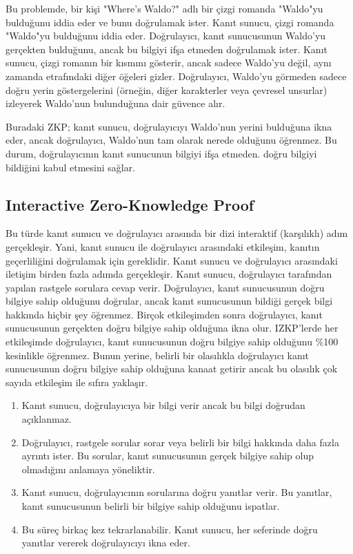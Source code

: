 Bu problemde, bir kişi "Where's Waldo?" adlı bir çizgi romanda "Waldo"yu bulduğunu iddia eder ve bunu doğrulamak ister. Kanıt sunucu, çizgi romanda "Waldo"yu bulduğunu iddia eder. Doğrulayıcı, kanıt sunucusunun Waldo'yu gerçekten bulduğunu, ancak bu bilgiyi ifşa etmeden doğrulamak ister. Kanıt sunucu, çizgi romanın bir kısmını gösterir, ancak sadece Waldo'yu değil, aynı zamanda etrafındaki diğer öğeleri gizler. Doğrulayıcı, Waldo'yu görmeden sadece doğru yerin göstergelerini (örneğin, diğer karakterler veya çevresel unsurlar) izleyerek Waldo'nun bulunduğuna dair güvence alır.

Buradaki ZKP; kanıt sunucu, doğrulayıcıyı Waldo'nun yerini bulduğuna ikna eder, ancak doğrulayıcı, Waldo'nun tam olarak nerede olduğunu öğrenmez. Bu durum, doğrulayıcının kanıt sunucunun bilgiyi ifşa etmeden. doğru bilgiyi bildiğini kabul etmesini sağlar.

\newpage

\subsection{Interactive Zero-Knowledge Proof}

Bu türde kanıt sunucu ve doğrulayıcı arasında bir dizi interaktif (karşılıklı) adım gerçekleşir. Yani, kanıt sunucu ile doğrulayıcı arasındaki etkileşim, kanıtın geçerliliğini doğrulamak için gereklidir. Kanıt sunucu ve doğrulayıcı arasındaki iletişim birden fazla adımda gerçekleşir. Kanıt sunucu, doğrulayıcı tarafından yapılan rastgele sorulara cevap verir. Doğrulayıcı, kanıt sunucusunun doğru bilgiye sahip olduğunu doğrular, ancak kanıt sunucusunun bildiği gerçek bilgi hakkında hiçbir şey öğrenmez. Birçok etkileşimden sonra doğrulayıcı, kanıt sunucusunun gerçekten doğru bilgiye sahip olduğuna ikna olur. IZKP’lerde her etkileşimde doğrulayıcı, kanıt sunucusunun doğru bilgiye sahip olduğunu \%100 kesinlikle öğrenmez. Bunun yerine, belirli bir olasılıkla doğrulayıcı kanıt sunucusunun doğru bilgiye sahip olduğuna kanaat getirir ancak bu olasılık çok sayıda etkileşim ile sıfıra yaklaşır.

\begin{enumerate}
    \item Kanıt sunucu, doğrulayıcıya bir bilgi verir ancak bu bilgi doğrudan açıklanmaz.
    \item Doğrulayıcı, rastgele sorular sorar veya belirli bir bilgi hakkında daha fazla ayrıntı ister. Bu sorular, kanıt sunucusunun gerçek bilgiye sahip olup olmadığını anlamaya yöneliktir.
    \item Kanıt sunucu, doğrulayıcının sorularına doğru yanıtlar verir. Bu yanıtlar, kanıt sunucusunun belirli bir bilgiye sahip olduğunu ispatlar.
    \item Bu süreç birkaç kez tekrarlanabilir. Kanıt sunucu, her seferinde doğru yanıtlar vererek doğrulayıcıyı ikna eder.
\end{enumerate}

